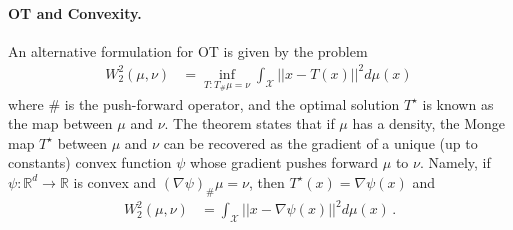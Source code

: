 \paragraph{OT and Convexity.} 
An alternative formulation for OT is given by the \citet{monge1781histoire} problem  
\begin{align}\label{eq:monge}
W_2^2(\mu,\nu) &= \inf_{T:T_{\#} \mu = \nu} \int_\mathcal{X} ||x - T(x)||^2d\mu(x) \,
\end{align}
where $\#$ is the push-forward operator, and the optimal solution $T^\star$ is known as the \citeauthor{monge1781histoire} map between $\mu$ and $\nu$. The \citeauthor{brenier1987decomposition} theorem \citeyear{brenier1987decomposition} states that if $\mu$ has a density, the Monge map $T^\star$ between $\mu$ and $\nu$ can be recovered as the gradient of a unique (up to constants) convex function $\psi$ whose gradient pushes forward $\mu$ to $\nu$. Namely, if $\psi:\mathbb{R}^d \rightarrow \mathbb{R}$ is convex and $(\nabla \psi)_{\#}\mu = \nu$, then $T^\star(x)=\nabla \psi(x)$ and
\begin{align}\label{eq:brenier}
W_2^2(\mu,\nu) &= \int_\mathcal{X} ||x - \nabla \psi(x)||^2 d\mu(x)\,.
\end{align}

